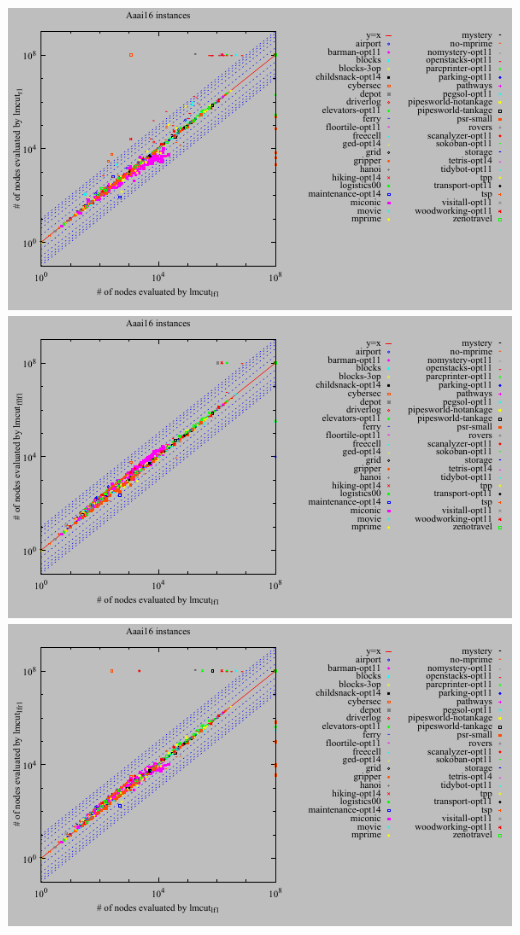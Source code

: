 \includegraphics{tables/aaai16-evaluated-lmcut_lf-lmcut_r.pdf}
\linebreak
\includegraphics{tables/aaai16-evaluated-lmcut_lf-lmcut_fflf.pdf}
\linebreak
\includegraphics{tables/aaai16-evaluated-lmcut_lf-lmcut_lfr.pdf}
\linebreak
